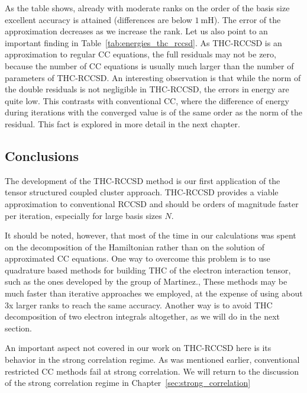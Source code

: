 %
As the table shows, already with moderate ranks on the order of the basis size 
excellent accuracy is attained (differences are below $1 ~ \mathrm{mH}$). The 
error of the approximation decreases as we increase the rank. Let us 
also point to an important finding in Table~\ref{tab:energies_thc_rccsd}. As 
THC-RCCSD is an approximation to regular CC equations, the full residuals may 
not be zero, because the number of CC equations is usually much larger than the 
number of parameters of THC-RCCSD. An interesting observation is that while 
the norm of the double residuals is not negligible in THC-RCCSD, the errors in 
energy are quite low. This contrasts with conventional CC, where the 
difference of energy during iterations with the converged value  
is of the same order as the norm of the residual. This fact is explored in 
more detail in the next chapter. 

\subsection{Conclusions}
The development of the THC-RCCSD method is our first application of the tensor 
structured coupled cluster approach.\cite{schutski2017tensor} THC-RCCSD provides 
a viable approximation to conventional RCCSD and should be orders of magnitude 
faster per iteration, especially for large basis sizes $N$. 

It should be noted, however, that most of the time in our 
calculations was spent on the decomposition of the Hamiltonian rather
than on the solution of approximated CC equations. 
One way to overcome this problem is to use quadrature based methods for 
building THC of the electron interaction tensor, such as the ones developed by 
the group of Martinez.\cite{hohenstein_thc1},\cite{parrish2013discrete} These 
methods may be much faster than iterative approaches we employed, at the 
expense of using about 3x larger ranks to reach the same 
accuracy.\cite{parrish2013discrete} Another way is to avoid THC decomposition 
of two electron integrals altogether, as we will do in the next
section.

An important aspect not covered in our work on THC-RCCSD here is its behavior 
in the strong correlation regime. As was mentioned earlier, conventional 
restricted 
CC methods fail at strong correlation. We will return to the 
discussion of the strong correlation regime in 
Chapter~\ref{sec:strong_correlation}